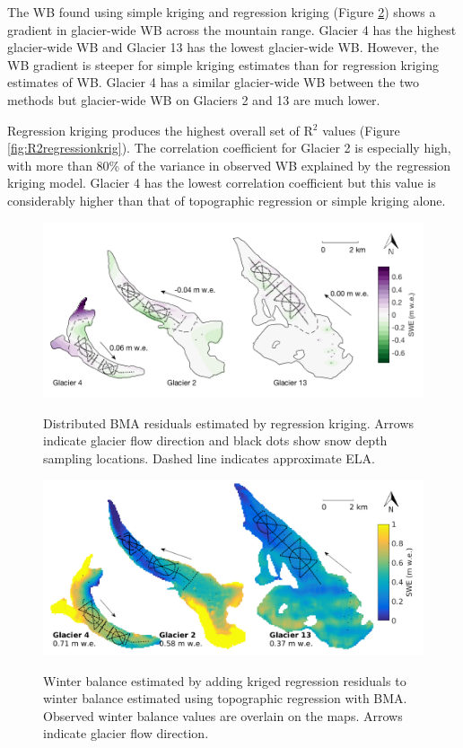 \documentclass{sfuthesis}
\newcommand{\topomap}{Arrows indicate glacier flow direction and black dots show snow depth sampling locations. }
\newcommand{\swedots}{Observed winter balance values are overlain on the maps. }
\begin{document}
The WB found using simple kriging and regression kriging (Figure \ref{fig:Regression-Kriging}) shows a gradient in glacier-wide WB across the mountain range. Glacier 4 has the highest glacier-wide WB and Glacier 13 has the lowest glacier-wide WB. However, the WB gradient is steeper for simple kriging estimates than for regression kriging estimates of WB. Glacier 4 has a similar glacier-wide WB between the two methods but glacier-wide WB on Glaciers 2 and 13 are much lower.  

Regression kriging produces the highest overall set of R$^2$ values (Figure \ref{fig:R2regressionkrig}). The correlation coefficient for Glacier 2 is especially high, with more than 80\% of the variance in observed WB explained by the regression kriging model. Glacier 4 has the lowest correlation coefficient but this value is considerably higher than that of topographic regression or simple kriging alone. 

\begin{figure}[H]
	\centering
	\includegraphics[width = \textwidth]{residualsKriged.png}\\
	\caption{Distributed BMA residuals estimated by regression kriging.  \topomap Dashed line indicates approximate ELA.}
	\label{fig:residualsKRIGING}
\end{figure}

\begin{figure}[H]
	\centering
	\includegraphics[width = \textwidth]{RegressionKriging.png}\\
	\caption{Winter balance estimated by adding kriged regression residuals to winter balance estimated using topographic regression with BMA. \swedots Arrows indicate glacier flow direction.}
	\label{fig:Regression-Kriging}
\end{figure}
\end{document}
